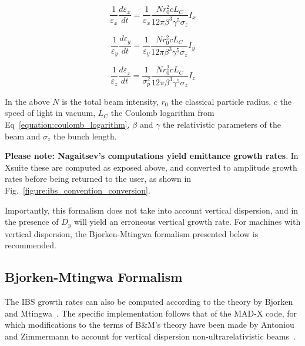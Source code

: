 \begin{equation}
    \boxed{\frac{1}{\varepsilon_x} \frac{d \varepsilon_x}{dt} = \frac{1}{\varepsilon_x} \frac{N r_0^{2} c L_C}{12 \pi \beta^3 \gamma^5 \sigma_z} I_x}
    \label{equation:nagaitsev_tx}
\end{equation}

\begin{equation}
    \boxed{\frac{1}{\varepsilon_y} \frac{d \varepsilon_y}{dt} = \frac{1}{\varepsilon_y} \frac{N r_0^{2} c L_C}{12 \pi \beta^3 \gamma^5 \sigma_z} I_y}
    \label{equation:nagaitsev_ty}
\end{equation}

\begin{equation}
    \boxed{\frac{1}{\varepsilon_z} \frac{d \varepsilon_z}{dt} = \frac{1}{\sigma_p^{2}} \frac{N r_0^{2} c L_C}{12 \pi \beta^3 \gamma^5 \sigma_z} I_z}
    \label{equation:nagaitsev_tz}
\end{equation}

In the above \(N\) is the total beam intensity, \(r_0\) the classical particle radius, \(c\) the speed of light in vacuum, \(L_C\) the Coulomb logarithm from Eq~\eqref{equation:coulomb_logarithm}, \(\beta\) and \(\gamma\) the relativistic parameters of the beam and \(\sigma_z\) the bunch length.
\newline

\textbf{Please note: Nagaitsev's computations yield emittance growth rates}.
In Xsuite these are computed as exposed above, and converted to amplitude growth rates before being returned to the user, as shown in Fig.~\ref{figure:ibs_convention_conversion}.
\newline

Importantly, this formalism does not take into account vertical dispersion, and in the presence of \(D_y\) will yield an erroneous vertical growth rate.
For machines with vertical dispersion, the Bjorken-Mtingwa formalism presented below is recommended.

\subsection{Bjorken-Mtingwa Formalism}
\label{subsection:bjorken_mtingwa_formalism}

The IBS growth rates can also be computed according to the theory by Bjorken and Mtingwa~\cite{CERN:Bjorken_Mtingwa:Intrabeam_Scattering}.
The specific implementation follows that of the MAD-X code, for which modifications to the terms of B\&M's theory have been made by Antoniou and Zimmermann to account for vertical dispersion non-ultrarelativistic beams~\cite{CERN:Antoniou:Revision_IBS_MADX}.
\newline

